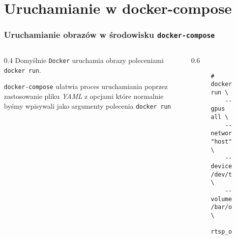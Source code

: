 \documentclass{beamer}
\begin{document}
\section{Uruchamianie w docker-compose}
\begin{frame}[fragile]
    \frametitle{Uruchamianie obrazów w środowisku \texttt{docker-compose}}
    \begin{columns}
        \begin{column}{0.4\textwidth}
            Domyślnie \texttt{Docker} uruchamia obrazy poleceniami \texttt{docker~run}.
    \pause

            \vspace{5mm}

            \texttt{docker-compose} ułatwia proces uruchamiania poprzez zastosowanie pliku \emph{YAML} z opcjami które normalnie byśmy wpisywali jako argumenty polecenia \texttt{docker~run}
        \end{column}
        \begin{column}{0.6\textwidth}
    \pause[0]
            \begin{figure}[H]
                \begin{lstlisting}[frame=single,basicstyle=\scriptsize\ttfamily,morekeywords={docker}]
# docker run \
    --gpus all \
    --network "host" \
    --device /dev/ttyUSB0:/dev/tty2 \
    --volume /bar/off/foo:/bar \
    rtsp_over_serial:latest
    \end{lstlisting}
            \end{figure}
        \end{column}
    \end{columns}
\end{frame}
\end{document}
